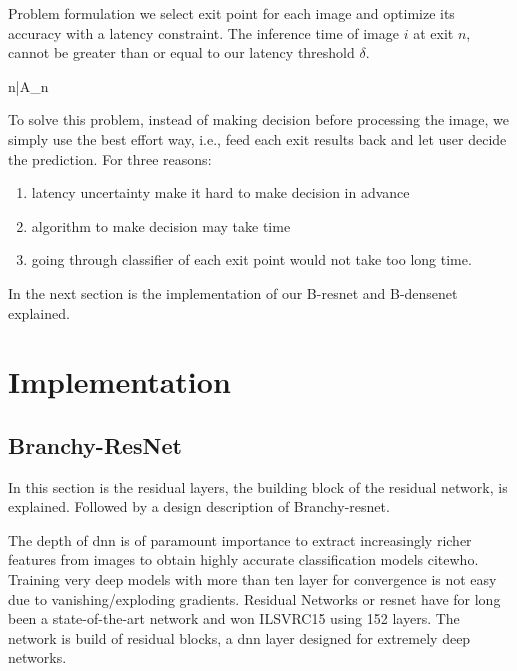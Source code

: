 \begin{enumdescript}
	\item[Problem formulation] we select exit point for each image and optimize its accuracy with a latency constraint. The inference time of image $ i $ at exit $ n $, cannot be greater than or equal to our latency threshold $ \delta $. 
	
	\begin{maxi}
		{n}{\bar{A}_{n}}
		{}{}
	\end{maxi}
	
	To solve this problem, instead of making decision before processing the image, we simply use the best effort way, i.e., feed each exit results back and let user decide the prediction. For three reasons:
	\begin{enumerate}
		\item latency uncertainty make it hard to make decision in advance
		\item algorithm to make decision may take time
		\item going through classifier of each exit point would not take too long time.
	\end{enumerate}
		
	\end{enumdescript}


In the next section is the implementation of our B-\gls{resnet} and B-\gls{densenet} explained.


\section{Implementation} \label{sec:ee-implementation}

\subsection{Branchy-ResNet} 

In this section is the residual layers, the building block of the residual network, is explained. Followed by a design description of Branchy-\gls{resnet}.

The depth of \gls{dnn} is of paramount importance to extract increasingly richer features from images to obtain highly accurate classification models cite{who}. Training very deep models with more than ten layer for convergence is not easy due to vanishing/exploding gradients. Residual Networks or \gls{resnet} \cite{he_deep_2015} have for long been a state-of-the-art network and won ILSVRC15 using 152 layers. The network is build of residual blocks, a \gls{dnn} layer designed for extremely deep networks. 

